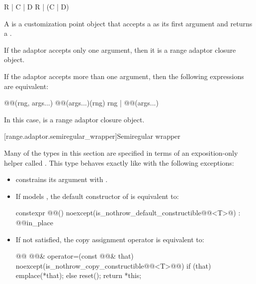 {\begin{codeblock}
R | C | D
R | (C | D)
\end{codeblock}

\pnum
A  is a
customization point object
that accepts a  as its first argument and returns a
.

\pnum
If the adaptor accepts only one argument, then it is a range adaptor closure
object.

\pnum
If the adaptor accepts more than one argument, then the following expressions
are equivalent:

\begin{codeblock}
@@(rng, args...)
@@(args...)(rng)
rng | @@(args...)
\end{codeblock}

In this case,  is a  range adaptor
closure object.

[range.adaptor.semiregular_wrapper]{Semiregular wrapper}

\pnum
Many of the types in this section are specified in terms of an exposition-only
helper called . This type behaves exactly
like  with the following exceptions:

\begin{itemize}
\item {} constrains its argument
with .

\item If  models , the default
constructor of  is equivalent to:
\begin{codeblock}
constexpr @@()
  noexcept(is_nothrow_default_constructible@@<T>@)
  : @@{in_place}
{ }
\end{codeblock}

\item If 
   not
satisfied, the copy assignment operator is equivalent to:
\begin{codeblock}
@@ @@& operator=(const @@& that)
  noexcept(is_nothrow_copy_constructible@@<T>@@)
{
  if (that) emplace(*that);
  else reset();
  return *this;
}
\end{codeblock}


\end{itemize}}

